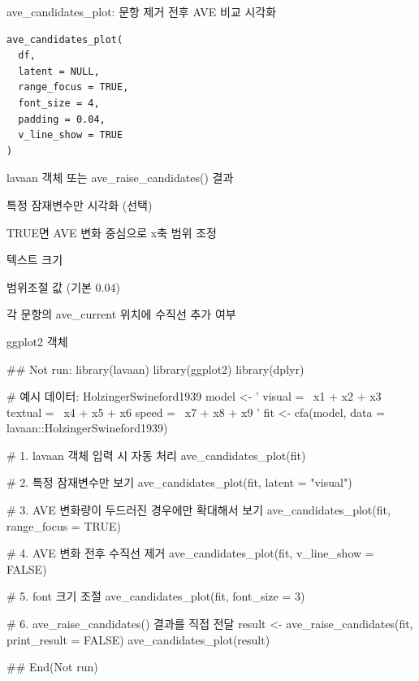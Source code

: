 \documentclass[a4paper]{book}
\begin{document}
%
\begin{Description}
ave\_candidates\_plot: 문항 제거 전후 AVE 비교 시각화
\end{Description}
%
\begin{Usage}
\begin{verbatim}
ave_candidates_plot(
  df,
  latent = NULL,
  range_focus = TRUE,
  font_size = 4,
  padding = 0.04,
  v_line_show = TRUE
)
\end{verbatim}
\end{Usage}
%
\begin{Arguments}
\begin{ldescription}
\item[\code{df}] lavaan 객체 또는 ave\_raise\_candidates() 결과

\item[\code{latent}] 특정 잠재변수만 시각화 (선택)

\item[\code{range\_focus}] TRUE면 AVE 변화 중심으로 x축 범위 조정

\item[\code{font\_size}] 텍스트 크기

\item[\code{padding}] 범위조절 값 (기본 0.04)

\item[\code{v\_line\_show}] 각 문항의 ave\_current 위치에 수직선 추가 여부
\end{ldescription}
\end{Arguments}
%
\begin{Value}
ggplot2 객체
\end{Value}
%
\begin{Examples}
\begin{ExampleCode}
## Not run: 
library(lavaan)
library(ggplot2)
library(dplyr)

# 예시 데이터: HolzingerSwineford1939
model <- '
  visual  =~ x1 + x2 + x3
  textual =~ x4 + x5 + x6
  speed   =~ x7 + x8 + x9
'
fit <- cfa(model, data = lavaan::HolzingerSwineford1939)

# 1. lavaan 객체 입력 시 자동 처리
ave_candidates_plot(fit)

# 2. 특정 잠재변수만 보기
ave_candidates_plot(fit, latent = "visual")

# 3. AVE 변화량이 두드러진 경우에만 확대해서 보기
ave_candidates_plot(fit, range_focus = TRUE)

# 4. AVE 변화 전후 수직선 제거
ave_candidates_plot(fit, v_line_show = FALSE)

# 5. font 크기 조절
ave_candidates_plot(fit, font_size = 3)

# 6. ave_raise_candidates() 결과를 직접 전달
result <- ave_raise_candidates(fit, print_result = FALSE)
ave_candidates_plot(result)

## End(Not run)
\end{ExampleCode}
\end{Examples}
\end{document}
